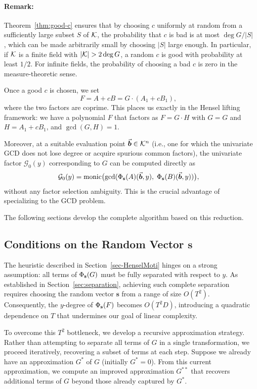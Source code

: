 \documentclass{article}
\numberwithin{equation}{section}
\begin{document}
\paragraph{Remark:} 
Theorem~\ref{thm:good-c} ensures that by choosing $c$ uniformly at random from a sufficiently large subset $S$ of ${\mathcal{K}}$, the probability that $c$ is bad is at most $\deg G / |S|$, which can be made arbitrarily small by choosing $|S|$ large enough. In particular, if ${\mathcal{K}}$ is a finite field with $|{\mathcal{K}}| > 2\deg G$, a random $c$ is good with probability at least $1/2$. For infinite fields, the probability of choosing a bad $c$ is zero in the measure-theoretic sense.


Once a good $c$ is chosen, we set
\[
F = A + c B = G \cdot (A_1 + c B_1),
\]
where the two factors are coprime. This places us exactly in the Hensel lifting framework: we have a polynomial $F$ that factors as $F = G \cdot H$ with $G = G$ and $H = A_1 + c B_1$, and $\gcd(G, H) = 1$.

Moreover, at a suitable evaluation point $\vec{\boldsymbol{b}} \in {\mathcal{K}}^n$ (i.e., one for which the univariate GCD does not lose degree or acquire spurious common factors), the univariate factor $\mathcal{G}_0(y)$ corresponding to $G$ can be computed directly as
\[
\mathcal{G}_0(y) = \operatorname{monic}\bigl( \gcd( \Phi_{\mathbf{s}}(A)(\vec{\boldsymbol{b}}, y),\; \Phi_{\mathbf{s}}(B)(\vec{\boldsymbol{b}}, y) ) \bigr),
\]
without any factor selection ambiguity. This is the crucial advantage of specializing to the GCD problem.

The following sections develop the complete algorithm based on this reduction.



\subsection{Conditions on the Random Vector $\mathbf{s}$}
\label{sec:params}


The heuristic described in Section~\ref{sec-HenselMoti} hinges on a strong assumption: all terms of $\Phi_{\mathbf{s}}(G)$ must be fully separated with respect to $y$. As established in Section~\ref{sec:separation}, achieving such complete separation requires choosing the random vector $\mathbf{s}$ from a range of size $O(T^2)$. Consequently, the $y$-degree of $\Phi_{\mathbf{s}}(F)$ becomes $O(T^2 D)$, introducing a quadratic dependence on $T$ that undermines our goal of linear complexity.

To overcome this $T^2$ bottleneck, we develop a recursive approximation strategy. Rather than attempting to separate all terms of $G$ in a single transformation, we proceed iteratively, recovering a subset of terms at each step. Suppose we already have an approximation $G^*$ of $G$ (initially $G^* = 0$). From this current approximation, we compute an improved approximation $G^{**}$ that recovers additional terms of $G$ beyond those already captured by $G^*$.
\end{document}
